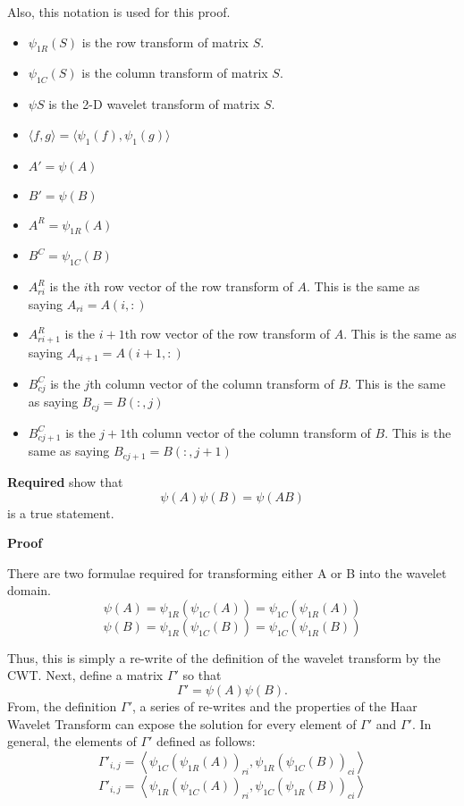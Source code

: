 Also, this notation is used for this proof.
\begin{itemize}
\item $\psi_{1R}(S)$ is the row transform of matrix $S$.
\item $\psi_{1C}(S)$ is the column transform of matrix $S$.
\item $\psi {S}$ is the 2-D wavelet transform of matrix $S$.
\item $\langle f,g \rangle = \langle \psi_1(f) , \psi_1(g) \rangle $
\item $A' = \psi(A)$
\item $B' = \psi(B)$
\item $A^R =\psi_{1R}(A) $
\item $B^C =\psi_{1C}(B) $ 
\item $A^R_{ri}$ is the $i$th row vector of the row transform of $A$.  This is the same as saying $A_{ri} = A(i,:)$ 
\item $A^R_{ri+1}$ is the $i+1$th row vector  of the row transform of $A$. This is the same as saying $A_{ri+1} = A(i+1,:)$ 
\item $B^C_{cj}$ is the $j$th  column vector  of the column transform of $B$.  This is the same as saying $B_{cj} = B(:,j)$ 
\item $B^C_{cj+1}$ is the $j+1$th column vector of the column transform of $B$.  This is the same as saying $B_{cj+1} = B(:,j+1)$ 
\end{itemize}

\textbf{Required} show that 
\[ \psi (A) \psi (B) = \psi (A B) \]
is a true statement. %


\textbf{Proof}

There are two formulae required for transforming either A or B into the wavelet domain.
\begin{equation}
\label{wavedefc4A}
 \psi (A) = \psi _{1R} ( \psi_{1C} (A)) = \psi _{1C} ( \psi_{1R} (A))
\end{equation}
\begin{equation}
\label{wavedefc4B}
\psi (B) = \psi _{1R} ( \psi_{1C} (B)) = \psi _{1C} ( \psi_{1R} (B))    
\end{equation}

Thus, this is simply a re-write of the definition of the wavelet transform by the CWT.   Next,  define a matrix $\Gamma'$  so that
\[\Gamma' = \psi (A) \psi (B). \]  From, the definition $\Gamma'$, a series of re-writes and the properties of the Haar Wavelet Transform can expose the solution for every element of $\Gamma'$ and $\Gamma'$.  In general, the elements of $\Gamma'$ defined as follows:
\begin{equation}
\label{wavecrossA}
\Gamma'_{i,j} =   \left\langle \psi_{1C} (\psi_{1R} (A)) _{ri} , \psi_{1R} (\psi_{1C} (B)) _{ci}  \right\rangle
\end{equation}
\begin{equation}
\label{wavecrossB}
\Gamma'_{i,j} =   \left\langle \psi_{1R} (\psi_{1C} (A)) _{ri} , \psi_{1C} (\psi_{1R} (B)) _{ci}  \right\rangle
\end{equation}


